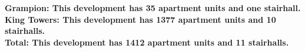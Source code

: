 \bf{Grampion}: This development has 35 apartment units and one stairhall.\\\bf{King Towers}: This development has 1377 apartment units and 10 stairhalls.\\\bf{Total}: This development has 1412 apartment units and 11 stairhalls.\\
